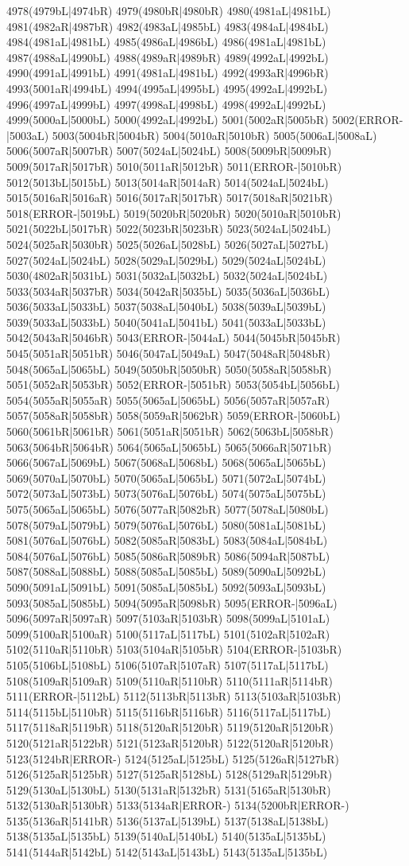 4978(4979bL|4974bR) 4979(4980bR|4980bR) 4980(4981aL|4981bL) 4981(4982aR|4987bR) 4982(4983aL|4985bL) 4983(4984aL|4984bL) 4984(4981aL|4981bL) 4985(4986aL|4986bL) 4986(4981aL|4981bL) 4987(4988aL|4990bL) 4988(4989aR|4989bR) 4989(4992aL|4992bL) 4990(4991aL|4991bL) 4991(4981aL|4981bL) 4992(4993aR|4996bR) 4993(5001aR|4994bL) 4994(4995aL|4995bL) 4995(4992aL|4992bL) 4996(4997aL|4999bL) 4997(4998aL|4998bL) 4998(4992aL|4992bL) 4999(5000aL|5000bL) 5000(4992aL|4992bL) 5001(5002aR|5005bR) 5002(ERROR-|5003aL) 5003(5004bR|5004bR) 5004(5010aR|5010bR) 5005(5006aL|5008aL) 5006(5007aR|5007bR) 5007(5024aL|5024bL) 5008(5009bR|5009bR) 5009(5017aR|5017bR) 5010(5011aR|5012bR) 5011(ERROR-|5010bR) 5012(5013bL|5015bL) 5013(5014aR|5014aR) 5014(5024aL|5024bL) 5015(5016aR|5016aR) 5016(5017aR|5017bR) 5017(5018aR|5021bR) 5018(ERROR-|5019bL) 5019(5020bR|5020bR) 5020(5010aR|5010bR) 5021(5022bL|5017bR) 5022(5023bR|5023bR) 5023(5024aL|5024bL) 5024(5025aR|5030bR) 5025(5026aL|5028bL) 5026(5027aL|5027bL) 5027(5024aL|5024bL) 5028(5029aL|5029bL) 5029(5024aL|5024bL) 5030(4802aR|5031bL) 5031(5032aL|5032bL) 5032(5024aL|5024bL) 5033(5034aR|5037bR) 5034(5042aR|5035bL) 5035(5036aL|5036bL) 5036(5033aL|5033bL) 5037(5038aL|5040bL) 5038(5039aL|5039bL) 5039(5033aL|5033bL) 5040(5041aL|5041bL) 5041(5033aL|5033bL) 5042(5043aR|5046bR) 5043(ERROR-|5044aL) 5044(5045bR|5045bR) 5045(5051aR|5051bR) 5046(5047aL|5049aL) 5047(5048aR|5048bR) 5048(5065aL|5065bL) 5049(5050bR|5050bR) 5050(5058aR|5058bR) 5051(5052aR|5053bR) 5052(ERROR-|5051bR) 5053(5054bL|5056bL) 5054(5055aR|5055aR) 5055(5065aL|5065bL) 5056(5057aR|5057aR) 5057(5058aR|5058bR) 5058(5059aR|5062bR) 5059(ERROR-|5060bL) 5060(5061bR|5061bR) 5061(5051aR|5051bR) 5062(5063bL|5058bR) 5063(5064bR|5064bR) 5064(5065aL|5065bL) 5065(5066aR|5071bR) 5066(5067aL|5069bL) 5067(5068aL|5068bL) 5068(5065aL|5065bL) 5069(5070aL|5070bL) 5070(5065aL|5065bL) 5071(5072aL|5074bL) 5072(5073aL|5073bL) 5073(5076aL|5076bL) 5074(5075aL|5075bL) 5075(5065aL|5065bL) 5076(5077aR|5082bR) 5077(5078aL|5080bL) 5078(5079aL|5079bL) 5079(5076aL|5076bL) 5080(5081aL|5081bL) 5081(5076aL|5076bL) 5082(5085aR|5083bL) 5083(5084aL|5084bL) 5084(5076aL|5076bL) 5085(5086aR|5089bR) 5086(5094aR|5087bL) 5087(5088aL|5088bL) 5088(5085aL|5085bL) 5089(5090aL|5092bL) 5090(5091aL|5091bL) 5091(5085aL|5085bL) 5092(5093aL|5093bL) 5093(5085aL|5085bL) 5094(5095aR|5098bR) 5095(ERROR-|5096aL) 5096(5097aR|5097aR) 5097(5103aR|5103bR) 5098(5099aL|5101aL) 5099(5100aR|5100aR) 5100(5117aL|5117bL) 5101(5102aR|5102aR) 5102(5110aR|5110bR) 5103(5104aR|5105bR) 5104(ERROR-|5103bR) 5105(5106bL|5108bL) 5106(5107aR|5107aR) 5107(5117aL|5117bL) 5108(5109aR|5109aR) 5109(5110aR|5110bR) 5110(5111aR|5114bR) 5111(ERROR-|5112bL) 5112(5113bR|5113bR) 5113(5103aR|5103bR) 5114(5115bL|5110bR) 5115(5116bR|5116bR) 5116(5117aL|5117bL) 5117(5118aR|5119bR) 5118(5120aR|5120bR) 5119(5120aR|5120bR) 5120(5121aR|5122bR) 5121(5123aR|5120bR) 5122(5120aR|5120bR) 5123(5124bR|ERROR-) 5124(5125aL|5125bL) 5125(5126aR|5127bR) 5126(5125aR|5125bR) 5127(5125aR|5128bL) 5128(5129aR|5129bR) 5129(5130aL|5130bL) 5130(5131aR|5132bR) 5131(5165aR|5130bR) 5132(5130aR|5130bR) 5133(5134aR|ERROR-) 5134(5200bR|ERROR-) 5135(5136aR|5141bR) 5136(5137aL|5139bL) 5137(5138aL|5138bL) 5138(5135aL|5135bL) 5139(5140aL|5140bL) 5140(5135aL|5135bL) 5141(5144aR|5142bL) 5142(5143aL|5143bL) 5143(5135aL|5135bL) 